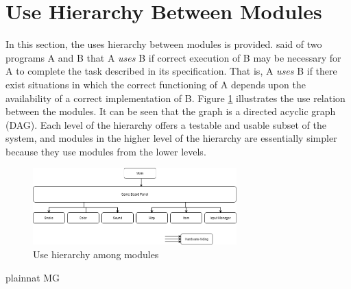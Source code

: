 \documentclass[12pt, titlepage]{article}
\begin{document}
\section{Use Hierarchy Between Modules} \label{SecUse}

In this section, the uses hierarchy between modules is
provided. \citet{Parnas1978} said of two programs A and B that A {\em uses} B if
correct execution of B may be necessary for A to complete the task described in
its specification. That is, A {\em uses} B if there exist situations in which
the correct functioning of A depends upon the availability of a correct
implementation of B.  Figure \ref{FigUH} illustrates the use relation between
the modules. It can be seen that the graph is a directed acyclic graph
(DAG). Each level of the hierarchy offers a testable and usable subset of the
system, and modules in the higher level of the hierarchy are essentially simpler
because they use modules from the lower levels.

\begin{figure}[H]
\centering
\includegraphics[width=0.7\textwidth]{UsesHierarchy.png}
\caption{Use hierarchy among modules}
\label{FigUH}
\end{figure}


 {plainnat}
 {MG}
\end{document}
